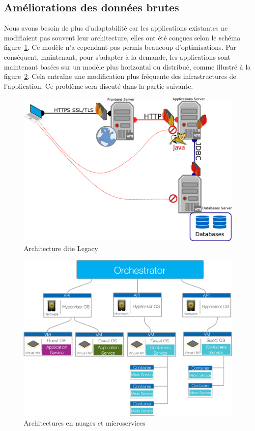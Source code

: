 \documentclass[10pt,a4paper,oneside]{article}
\begin{document}
\begin{multicols}{2}
\section{Améliorations des données brutes}
Nous avons besoin de plus d’adaptabilité car les applications existantes ne modifiaient pas souvent leur architecture, elles ont été conçues selon le schéma figure~\ref{omodl}. Ce modèle n’a cependant pas permis beaucoup d’optimisations. Par conséquent, maintenant, pour s’adapter à la demande, les applications sont maintenant basées sur un modèle plus horizontal ou distribué, comme illustré à la figure~\ref{nmodl}. Cela entraîne une modification plus fréquente des infrastructures de l'application. Ce problème sera discuté dans la partie suivante.

\end{multicols}

\begin{figure}[!ht]
\centering
\includegraphics[scale=0.40]{./images/PNG/Application_legacy.png}
\caption{Architecture dite Legacy}
\label{omodl}
\end{figure}

\vspace{0.5cm}

\begin{figure}[!ht]
\centering
\includegraphics[scale=0.60]{./images/PNG/micro_archi.png}
\caption{Architectures en nuages et microservices}
\label{nmodl}
\end{figure}
\end{document}
